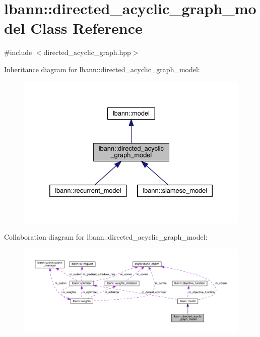 \hypertarget{classlbann_1_1directed__acyclic__graph__model}{}\section{lbann\+:\+:directed\+\_\+acyclic\+\_\+graph\+\_\+model Class Reference}
\label{classlbann_1_1directed__acyclic__graph__model}


{\ttfamily \#include $<$directed\+\_\+acyclic\+\_\+graph.\+hpp$>$}



Inheritance diagram for lbann\+:\+:directed\+\_\+acyclic\+\_\+graph\+\_\+model\+:\nopagebreak
\begin{figure}[H]
\begin{center}
\leavevmode
\includegraphics[width=332pt]{classlbann_1_1directed__acyclic__graph__model__inherit__graph}
\end{center}
\end{figure}


Collaboration diagram for lbann\+:\+:directed\+\_\+acyclic\+\_\+graph\+\_\+model\+:\nopagebreak
\begin{figure}[H]
\begin{center}
\leavevmode
\includegraphics[width=350pt]{classlbann_1_1directed__acyclic__graph__model__coll__graph}
\end{center}
\end{figure}
